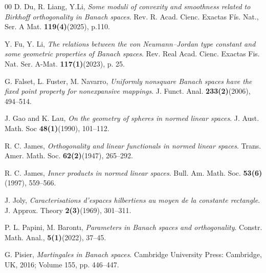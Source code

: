 \documentclass[preprint,12pt]{elsarticle}
\numberwithin{equation}{section}
\begin{document}
\begin{thebibliography}{00}
 D. Du, R. Liang,  Y.Li, \textit{Some moduli of convexity and smoothness related to Birkhoff orthogonality in Banach spaces}. 	Rev. R. Acad. Cienc. Exactas Fís. Nat., Ser. A Mat. \textbf{119(4)}(2025), p.110.









 Y. Fu, Y. Li, \textit{The relations between the von Neumann--Jordan type constant and some geometric properties of Banach spaces}. Rev. Real Acad. Cienc. Exactas Fis. Nat. Ser. A-Mat. \textbf{117(1)}(2023), p. 25.

 G. Falset, L. Fuster, M. Navarro, \textit{Uniformly nonsquare Banach spaces have the fixed point property for nonexpansive mappings}. J. Funct. Anal. \textbf{233(2)}(2006), 494--514.

 J. Gao and K. Lau, \textit{On the geometry of spheres in normed linear spaces}. J. Aust. Math. Soc \textbf{48(1)}(1990), 101--112.

 R. C. James,
\textit{Orthogonality and linear functionals in normed linear spaces}. Trans. Amer. Math. Soc. \textbf{62(2)}(1947), 265--292.

 R. C. James, \textit{Inner products in normed linear spaces}. Bull. Am. Math. Soc. \textbf{53(6)}(1997), 559--566.



  J. Joly, \textit{Caracterisations d'espaces hilbertiens au moyen de la constante rectangle}.  J. Approx. Theory \textbf{2(3)}(1969), 301--311.


 P. L. Papini, M. Baront{\i}, \textit{Parameters in Banach spaces and orthogonality}. 	Constr. Math. Anal., \textbf{5(1)}(2022), 37--45.

 G. Pisier, \textit{Martingales in Banach spaces}. Cambridge University Press: Cambridge, UK, 2016; Volume 155, pp. 446–447.


\end{thebibliography}
\end{document}
